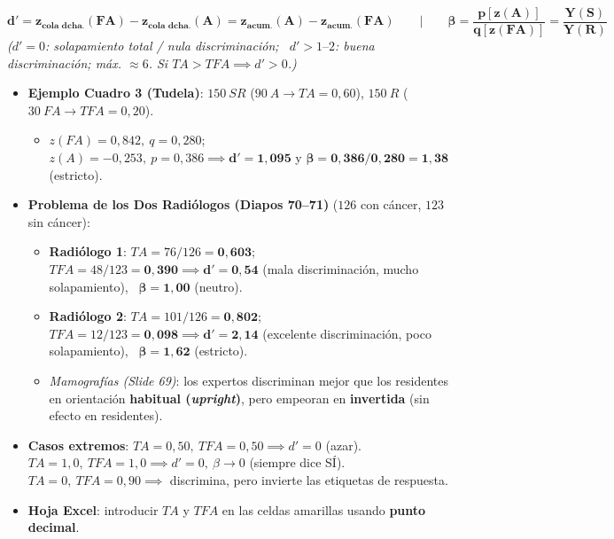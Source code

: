 \documentclass[11pt,a4paper]{article}
\begin{document}
\begin{cajaFormula}[title={Fórmulas de $d'$ y $\beta$ y Casos Resueltos de Examen}]
\[
  \mathbf{d' = z_{\text{cola dcha.}}(FA) - z_{\text{cola dcha.}}(A) = z_{\text{acum.}}(A) - z_{\text{acum.}}(FA)} \qquad\big|\qquad \mathbf{\beta = \frac{p[z(A)]}{q[z(FA)]} = \frac{Y(S)}{Y(R)}}
\]
\textit{($d'=0$: solapamiento total / nula discriminación; \ $d'>1\text{--}2$: buena discriminación; máx. $\approx 6$. Si $TA > TFA \implies d' > 0$.)}

\vspace{0.3em}
\begin{itemize}
  \item \textbf{Ejemplo Cuadro 3 (Tudela)}: $150\ SR$ ($90\ A \to TA=0,60$), $150\ R$ ($30\ FA \to TFA=0,20$).
  \begin{itemize}
    \item $z(FA)=0,842, \ q=0,280$; \ $z(A)=-0,253, \ p=0,386 \implies \mathbf{d'=1,095}$ y $\mathbf{\beta = 0,386 / 0,280 = 1,38}$ (estricto).
  \end{itemize}
  \item \textbf{Problema de los Dos Radiólogos (Diapos 70--71)} ($126$ con cáncer, $123$ sin cáncer):
  \begin{itemize}
    \item \textbf{Radiólogo 1}: $TA = 76/126 = \mathbf{0,603}$; \ $TFA = 48/123 = \mathbf{0,390} \implies \mathbf{d' = 0,54}$ (mala discriminación, mucho solapamiento), \ $\mathbf{\beta = 1,00}$ (neutro).
    \item \textbf{Radiólogo 2}: $TA = 101/126 = \mathbf{0,802}$; \ $TFA = 12/123 = \mathbf{0,098} \implies \mathbf{d' = 2,14}$ (excelente discriminación, poco solapamiento), \ $\mathbf{\beta = 1,62}$ (estricto).
    \item \textit{Mamografías (Slide 69)}: los expertos discriminan mejor que los residentes en orientación \textbf{habitual (\textit{upright})}, pero empeoran en \textbf{invertida} (sin efecto en residentes).
  \end{itemize}
  \item \textbf{Casos extremos}: $TA=0,50, \ TFA=0,50 \implies d'=0$ (azar). \ $TA=1,0, \ TFA=1,0 \implies d'=0, \ \beta \to 0$ (siempre dice SÍ). \ $TA=0, \ TFA=0,90 \implies$ discrimina, pero invierte las etiquetas de respuesta.
  \item \textbf{Hoja Excel}: introducir $TA$ y $TFA$ en las celdas amarillas usando \textbf{punto decimal}.
\end{itemize}
\end{cajaFormula}
\end{document}
